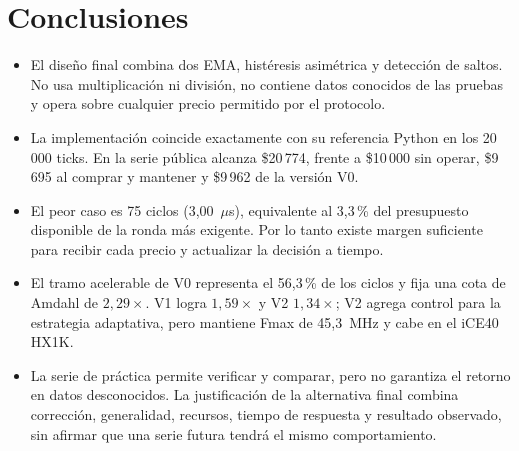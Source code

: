 \documentclass[11pt,letterpaper]{article}
\renewcommand{\_}{\textunderscore\allowbreak}
\begin{document}
\section{Conclusiones}
\begin{itemize}
  \item El diseño final combina dos EMA, histéresis asimétrica y detección de saltos. No usa multiplicación ni división, no contiene datos conocidos de las pruebas y opera sobre cualquier precio permitido por el protocolo.
  \item La implementación coincide exactamente con su referencia Python en los 20\,000 ticks. En la serie pública alcanza \$20\,774, frente a \$10\,000 sin operar, \$9\,695 al comprar y mantener y \$9\,962 de la versión V0.
  \item El peor caso es 75 ciclos (3,00~$\mu$s), equivalente al 3,3\,\% del presupuesto disponible de la ronda más exigente. Por lo tanto existe margen suficiente para recibir cada precio y actualizar la decisión a tiempo.
  \item El tramo acelerable de V0 representa el 56,3\,\% de los ciclos y fija una cota de Amdahl de $2{,}29\times$. V1 logra $1{,}59\times$ y V2 $1{,}34\times$; V2 agrega control para la estrategia adaptativa, pero mantiene Fmax de 45,3~MHz y cabe en el iCE40 HX1K.
  \item La serie de práctica permite verificar y comparar, pero no garantiza el retorno en datos desconocidos. La justificación de la alternativa final combina corrección, generalidad, recursos, tiempo de respuesta y resultado observado, sin afirmar que una serie futura tendrá el mismo comportamiento.
\end{itemize}
\end{document}
